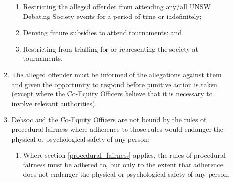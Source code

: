 \begin{enumerate}
\begin{enumerate}
    \begin{enumerate}
    \item Restricting the alleged offender from attending any/all UNSW Debating Society events for a period of time or indefinitely;
    \item Denying future subsidies to attend tournaments; and
    \item Restricting from trialling for or representing the society at tournaments.
    \end{enumerate}
  \item The alleged offender must be informed of the allegations against them and given the opportunity to respond before punitive action is taken (except where the Co-Equity Officers believe that it is necessary to involve relevant authorities).
  \item Debsoc and the Co-Equity Officers are not bound by the rules of procedural fairness where adherence to those rules would endanger the physical or psychological safety of any person: \label{procedural_fairness}
    \begin{enumerate}
    \item Where section \ref{procedural_fairness} applies, the rules of procedural fairness must be adhered to, but only to the extent that adherence does not endanger the physical or psychological safety of any person.
    \end{enumerate}
  \end{enumerate}
\end{enumerate}
